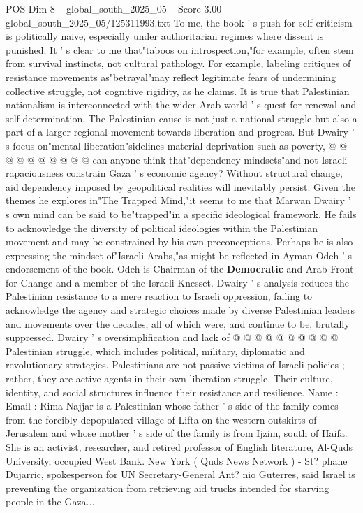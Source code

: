 \begin{textsample}{POS Dim 8 – global\_south\_2025\_05 – Score 3.00 – global\_south\_2025\_05/125311993.txt}
To me, the book ' s push for self-criticism is politically naive, especially under authoritarian regimes where dissent is punished.
It ' s clear to me that"taboos on introspection,"for example, often stem from survival instincts, not cultural pathology.
For example, labeling critiques of resistance movements as"betrayal"may reflect legitimate fears of undermining collective struggle, not cognitive rigidity, as he claims.
It is true that Palestinian nationalism is interconnected with the wider Arab world ' s quest for renewal and self-determination.
The Palestinian cause is not just a national struggle but also a part of a larger regional movement towards liberation and progress.
But Dwairy ' s focus on"mental liberation"sidelines material deprivation such as poverty, @ @ @ @ @ @ @ @ @ @ can anyone think that"dependency mindsets"and not Israeli rapaciousness constrain Gaza ' s economic agency?
Without structural change, aid dependency imposed by geopolitical realities will inevitably persist.
Given the themes he explores in"The Trapped Mind,"it seems to me that Marwan Dwairy ' s own mind can be said to be"trapped"in a specific ideological framework.
He fails to acknowledge the diversity of political ideologies within the Palestinian movement and may be constrained by his own preconceptions.
Perhaps he is also expressing the mindset of"Israeli Arabs,"as might be reflected in Ayman Odeh ' s endorsement of the book.
Odeh is Chairman of the \textbf{Democratic} and Arab Front for Change and a member of the Israeli Knesset.
Dwairy ' s analysis reduces the Palestinian resistance to a mere reaction to Israeli oppression, failing to acknowledge the agency and strategic choices made by diverse Palestinian leaders and movements over the decades, all of which were, and continue to be, brutally suppressed.
Dwairy ' s oversimplification and lack of @ @ @ @ @ @ @ @ @ @ Palestinian struggle, which includes political, military, diplomatic and revolutionary strategies.
Palestinians are not passive victims of Israeli policies ; rather, they are active agents in their own liberation struggle.
Their culture, identity, and social structures influence their resistance and resilience.
Name : Email : Rima Najjar is a Palestinian whose father ' s side of the family comes from the forcibly depopulated village of Lifta on the western outskirts of Jerusalem and whose mother ' s side of the family is from Ijzim, south of Haifa.
She is an activist, researcher, and retired professor of English literature, Al-Quds University, occupied West Bank.
New York ( Quds News Network ) - St? phane Dujarric, spokesperson for UN Secretary-General Ant? nio Guterres, said Israel is preventing the organization from retrieving aid trucks intended for starving people in the Gaza...

\end{textsample}
